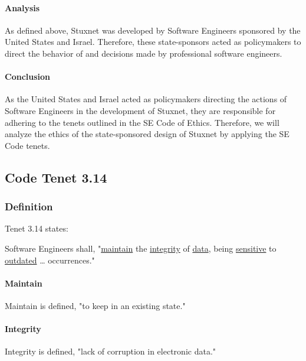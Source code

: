 \documentclass[12pt]{article}
\begin{document}
\begin{multicols}{2}
\paragraph{Analysis}

As defined above, Stuxnet was developed by Software Engineers sponsored by the United States and Israel. Therefore, these state-sponsors acted as policymakers to direct the behavior of and decisions made by professional software engineers.

\paragraph{Conclusion}

As the United States and Israel acted as policymakers directing the actions of Software Engineers in the development of Stuxnet, they are responsible for adhering to the tenets outlined in the SE Code of Ethics. Therefore, we will analyze the ethics of the state-sponsored design of Stuxnet by applying the SE Code tenets.

\subsection{Code Tenet 3.14}

\subsubsection{Definition}

Tenet 3.14 states:

\begin{framed}
Software Engineers shall, "\ul{maintain} the \ul{integrity} of \ul{data}, being \ul{sensitive} to \ul{outdated} … occurrences."\cite{softwareEngineeringCodeOfEthics}
\end{framed}

\paragraph{Maintain}

Maintain is defined, "to keep in an existing state."\cite{merriamWebsterDefinitions}

\paragraph{Integrity}

Integrity is defined, "lack of corruption in electronic data."\cite{oxfordDictionary}


\end{multicols}
\end{document}

